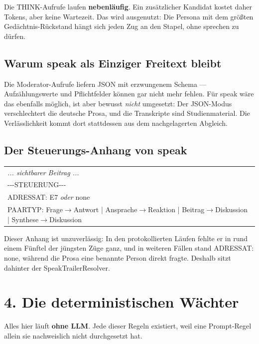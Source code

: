 \documentclass[11pt,a4paper]{article}
\newcommand{\code}[1]{{\ttfamily\small #1}}
\begin{document}
\medskip
Die THINK-Aufrufe laufen \textbf{nebenläufig}. Ein zusätzlicher Kandidat kostet daher
Tokens, aber keine Wartezeit. Das wird ausgenutzt: Die Persona mit dem größten
Gedächtnis-Rückstand hängt sich jeden Zug an den Stapel, ohne sprechen zu dürfen.

\subsection*{Warum \code{speak} als Einziger Freitext bleibt}

Die Moderator-Aufrufe liefern JSON mit erzwungenem Schema --- Aufzählungswerte und
Pflichtfelder können gar nicht mehr fehlen. Für \code{speak} wäre das ebenfalls möglich,
ist aber bewusst \emph{nicht} umgesetzt: Der JSON-Modus verschlechtert die deutsche
Prosa, und die Transkripte sind Studienmaterial. Die Verlässlichkeit kommt dort
stattdessen aus dem nachgelagerten Abgleich.

\subsection*{Der Steuerungs-Anhang von \code{speak}}

\begin{center}\ttfamily\small
\begin{tabular}{@{}l@{}}
\textrm{\emph{... sichtbarer Beitrag ...}}\\
-{}-{}-STEUERUNG-{}-{}-\\
ADRESSAT: E7 \textrm{\emph{oder}} none\\
PAARTYP: Frage$\rightarrow$Antwort | Ansprache$\rightarrow$Reaktion | Beitrag$\rightarrow$Diskussion | Synthese$\rightarrow$Diskussion\\
\end{tabular}
\end{center}

\medskip
Dieser Anhang ist unzuverlässig: In den protokollierten Läufen fehlte er in rund einem
Fünftel der jüngsten Züge ganz, und in weiteren Fällen stand \code{ADRESSAT: none},
während die Prosa eine benannte Person direkt fragte. Deshalb sitzt dahinter der
\code{SpeakTrailerResolver}.

\section*{4. Die deterministischen Wächter}

Alles hier läuft \textbf{ohne LLM}. Jede dieser Regeln existiert, weil eine Prompt-Regel
allein sie nachweislich nicht durchgesetzt hat.
\end{document}
